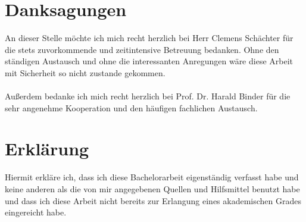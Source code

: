 \documentclass[%
thesis=student,%
coverpage=false,%
titlepage=false,%
headmarks=true, %
german,%
font=libertine, %
math=newpxtx, %
BCOR=5mm,%
coverBCOR=11mm%
]{tumbook}
\theoremstyle{break}
\begin{document}
\chapter{Danksagungen}
An dieser Stelle möchte ich mich recht herzlich bei Herr Clemens Schächter für die stets zuvorkommende und zeitintensive Betreuung bedanken. Ohne den ständigen Austausch und ohne die interessanten Anregungen wäre diese Arbeit mit Sicherheit so nicht zustande gekommen.\\
\\
Außerdem bedanke ich mich recht herzlich bei Prof. Dr. Harald Binder für die sehr angenehme Kooperation und den häufigen fachlichen Austausch. 
\chapter{Erklärung}
Hiermit erkläre ich, dass ich diese Bachelorarbeit eigenständig verfasst habe und keine anderen als
die von mir angegebenen Quellen und Hilfsmittel benutzt habe und dass ich diese Arbeit nicht
bereits zur Erlangung eines akademischen Grades eingereicht habe.
\end{document}
